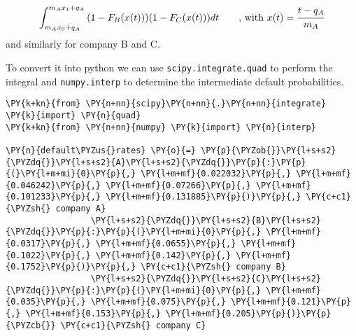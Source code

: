 \[ \int_{m_A x_0 + q_A}^{m_A x_1 + q_A}{(1-F_B(x(t)))(1-F_C(x(t)))dt}~~~~~~\textrm{, with}~x(t) = \cfrac{t -q_A}{m_A} \]
and similarly for company B and C.

To convert it into python we can use \texttt{scipy.integrate.quad} to
perform the integral and \texttt{numpy.interp} to determine the
intermediate default probabilities.

    \begin{tcolorbox}[breakable, size=fbox, boxrule=1pt, pad at break*=1mm,colback=cellbackground, colframe=cellborder]
\begin{Verbatim}[commandchars=\\\{\}]
\PY{k+kn}{from} \PY{n+nn}{scipy}\PY{n+nn}{.}\PY{n+nn}{integrate} \PY{k}{import} \PY{n}{quad}
\PY{k+kn}{from} \PY{n+nn}{numpy} \PY{k}{import} \PY{n}{interp}

\PY{n}{default\PYZus{}rates} \PY{o}{=} \PY{p}{\PYZob{}}\PY{l+s+s2}{\PYZdq{}}\PY{l+s+s2}{A}\PY{l+s+s2}{\PYZdq{}}\PY{p}{:}\PY{p}{(}\PY{l+m+mi}{0}\PY{p}{,} \PY{l+m+mf}{0.022032}\PY{p}{,} \PY{l+m+mf}{0.046242}\PY{p}{,} \PY{l+m+mf}{0.07266}\PY{p}{,} \PY{l+m+mf}{0.101233}\PY{p}{,} \PY{l+m+mf}{0.131885}\PY{p}{)}\PY{p}{,} \PY{c+c1}{\PYZsh{} company A}
                 \PY{l+s+s2}{\PYZdq{}}\PY{l+s+s2}{B}\PY{l+s+s2}{\PYZdq{}}\PY{p}{:}\PY{p}{(}\PY{l+m+mi}{0}\PY{p}{,} \PY{l+m+mf}{0.0317}\PY{p}{,} \PY{l+m+mf}{0.0655}\PY{p}{,} \PY{l+m+mf}{0.1022}\PY{p}{,} \PY{l+m+mf}{0.142}\PY{p}{,} \PY{l+m+mf}{0.1752}\PY{p}{)}\PY{p}{,} \PY{c+c1}{\PYZsh{} company B}
                 \PY{l+s+s2}{\PYZdq{}}\PY{l+s+s2}{C}\PY{l+s+s2}{\PYZdq{}}\PY{p}{:}\PY{p}{(}\PY{l+m+mi}{0}\PY{p}{,} \PY{l+m+mf}{0.035}\PY{p}{,} \PY{l+m+mf}{0.075}\PY{p}{,} \PY{l+m+mf}{0.121}\PY{p}{,} \PY{l+m+mf}{0.153}\PY{p}{,} \PY{l+m+mf}{0.205}\PY{p}{)}\PY{p}{\PYZcb{}} \PY{c+c1}{\PYZsh{} company C}


\end{Verbatim}
\end{tcolorbox}
